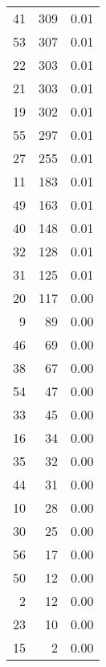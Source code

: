 \begin{table}
\begin{tabular}{rrr}
                        41 &        309 &        0.01 \\
                        53 &        307 &        0.01 \\
                        22 &        303 &        0.01 \\
                        21 &        303 &        0.01 \\
                        19 &        302 &        0.01 \\
                        55 &        297 &        0.01 \\
                        27 &        255 &        0.01 \\
                        11 &        183 &        0.01 \\
                        49 &        163 &        0.01 \\
                        40 &        148 &        0.01 \\
                        32 &        128 &        0.01 \\
                        31 &        125 &        0.01 \\
                        20 &        117 &        0.00 \\
                         9 &         89 &        0.00 \\
                        46 &         69 &        0.00 \\
                        38 &         67 &        0.00 \\
                        54 &         47 &        0.00 \\
                        33 &         45 &        0.00 \\
                        16 &         34 &        0.00 \\
                        35 &         32 &        0.00 \\
                        44 &         31 &        0.00 \\
                        10 &         28 &        0.00 \\
                        30 &         25 &        0.00 \\
                        56 &         17 &        0.00 \\
                        50 &         12 &        0.00 \\
                         2 &         12 &        0.00 \\
                        23 &         10 &        0.00 \\
                        15 &          2 &        0.00 \\
\bottomrule
\end{tabular}
\end{table}
